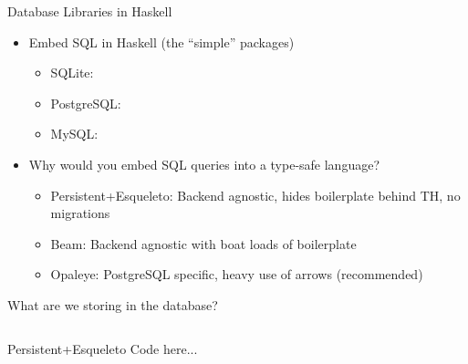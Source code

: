 \documentclass[hyperref={pdfpagelabels=false},12pt]{beamer}
\newcommand{\unnamedUrl}[1]{\href{#1}{\color{blue}{#1}}}
\newcommand{\pygment}[3]{\inputminted[bgcolor=lightgray,linenos,fontsize=#1]{#2}{#3}}
\begin{document}
\begin{frame}{Database Libraries in Haskell}
  \begin{itemize}
    \item Embed SQL in Haskell (the ``simple'' packages)
    \begin{itemize}
      \item SQLite: \unnamedUrl{https://hackage.haskell.org/package/sqlite-simple}
      \item PostgreSQL: \unnamedUrl{https://hackage.haskell.org/package/postgresql-simple}
      \item MySQL: \unnamedUrl{https://hackage.haskell.org/package/mysql-simple}
    \end{itemize}
    \item Why would you embed SQL queries into a type-safe language?
    \begin{itemize}
      \item Persistent+Esqueleto: Backend agnostic, hides boilerplate behind
        TH, no migrations
      \item Beam: Backend agnostic with boat loads of boilerplate
      \item Opaleye: PostgreSQL specific, heavy use of arrows (recommended)
    \end{itemize}
  \end{itemize}
\end{frame}

\begin{frame}{What are we storing in the database?}
  \pygment{\scriptsize}{haskell}{code/Person.hs}
\end{frame}

\begin{frame}{Persistent+Esqueleto}
  Code here...
\end{frame}
\end{document}

